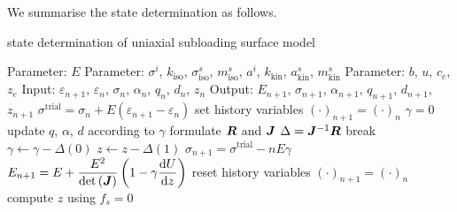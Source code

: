 We summarise the state determination as follows.
\begin{breakablealgorithm}
\caption{state determination of uniaxial subloading surface model}\label{algo:subloading_steel}
\begin{algorithmic}[1]
\State Parameter: $E$
\State Parameter: $\sigma^i$, $k_\text{iso}$, $\sigma^s_\text{iso}$, $m^s_\text{iso}$, $a^i$, $k_\text{kin}$, $a^s_\text{kin}$, $m^s_\text{kin}$
\State Parameter: $b$, $u$, $c_e$, $z_e$
\State Input: $\varepsilon_{n+1}$, $\varepsilon_n$, $\sigma_n$, $\alpha_{n}$, $q_n$, $d_n$, $z_n$
\State Output: $E_{n+1}$, $\sigma_{n+1}$, $\alpha_{n+1}$, $q_{n+1}$, $d_{n+1}$, $z_{n+1}$
\State $\sigma^\text{trial}=\sigma_n+E\left(\varepsilon_{n+1}-\varepsilon_n\right)$
\State set history variables $\left(\cdot\right)_{n+1}=\left(\cdot\right)_{n}$
\State $\gamma=0$
\State update $q$, $\alpha$, $d$ according to $\gamma$
\State formulate $\bm{R}$ and $\bm{J}$
\State $\Delta=\bm{J}^{-1}\bm{R}$
\State {}
\State break
\EndIf
\State $\gamma\leftarrow\gamma-\Delta\left(0\right)$
\State $z\leftarrow{}z-\Delta\left(1\right)$
\EndWhile
\State {}
\State $\sigma_{n+1}=\sigma^\text{trial}-nE\gamma$
\State $E_{n+1}=E+\dfrac{E^2}{\det\left(\bm{J}\right)}\left(1-\gamma{}\dfrac{\mathrm{d}U}{\mathrm{d}z}\right)$
\Else{}
\State reset history variables $\left(\cdot\right)_{n+1}=\left(\cdot\right)_{n}$
\State compute $z$ using $f_s=0$
\EndIf
\end{algorithmic}
\end{breakablealgorithm}

